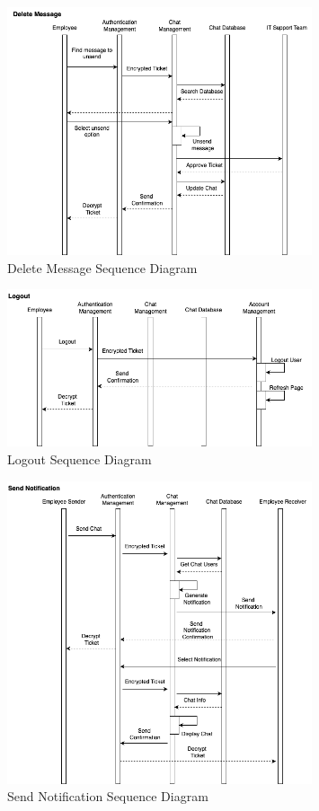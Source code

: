 \documentclass[]{article}
\begin{document}
\begin{figure}[H]
	\centering
	\includegraphics[width=0.8\textwidth]{BE9.png}
	\caption{Delete Message Sequence Diagram}
\end{figure}

\begin{figure}[H]
	\centering
	\includegraphics[width=0.8\textwidth]{BE10.png}
	\caption{Logout Sequence Diagram}
\end{figure}

\begin{figure}[H]
	\centering
	\includegraphics[width=0.8\textwidth]{BE11.png}
	\caption{Send Notification Sequence Diagram}
\end{figure}
\end{document}
